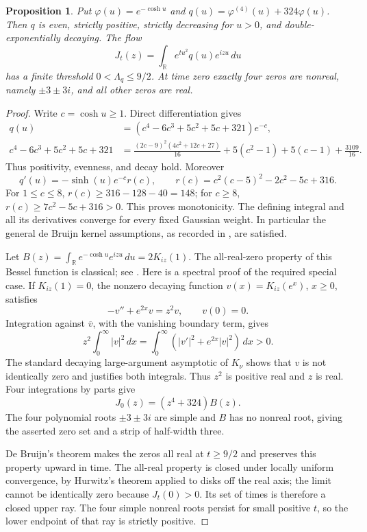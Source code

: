 \documentclass[11pt]{article}
\numberwithin{equation}{section}
\newtheorem{proposition}[theorem]{Proposition}
\theoremstyle{definition}
\theoremstyle{remark}
\newcommand{\dd}{\,d}
\begin{document}
\begin{proposition}\label{prop:kernel}
Put $\varphi(u)=e^{-\cosh u}$ and
$q(u)=\varphi^{(4)}(u)+324\varphi(u)$. Then $q$ is even, strictly
positive, strictly decreasing for $u>0$, and double-exponentially
decaying. The flow
\begin{equation}\label{eq:qflow}
 J_t(z)=\int_{\mathbb R}e^{tu^2}q(u)e^{izu}\dd u
\end{equation}
has a finite threshold $0<\Lambda_q\le9/2$. At time zero exactly four
zeros are nonreal, namely $\pm3\pm3i$, and all other zeros are real.
\end{proposition}
\begin{proof}
Write $c=\cosh u\ge1$. Direct differentiation gives
\begin{align*}
 q(u)&=(c^4-6c^3+5c^2+5c+321)e^{-c},\\
 c^4-6c^3+5c^2+5c+321
 &=\frac{(2c-9)^2(4c^2+12c+27)}{16}
   +5(c^2-1)+5(c-1)+\frac{3109}{16}.
\end{align*}
Thus positivity, evenness, and decay hold. Moreover
\[
 q'(u)=-\sinh(u)e^{-c}r(c),\qquad
 r(c)=c^2(c-5)^2-2c^2-5c+316.
\]
For $1\le c\le8$, $r(c)\ge316-128-40=148$; for $c\ge8$,
$r(c)\ge7c^2-5c+316>0$. This proves monotonicity. The defining
integral and all its derivatives converge for every fixed Gaussian
weight. In particular the general de Bruijn kernel assumptions, as
recorded in \cite[Theorem~7]{newmanwu}, are satisfied.

Let $B(z)=\int_{\mathbb R}e^{-\cosh u}e^{izu}\dd u=2K_{iz}(1)$.
The all-real-zero property of this Bessel function is classical; see
\cite{gasper}. Here is a spectral proof of the required special case.
If $K_{iz}(1)=0$, the nonzero decaying function $v(x)=K_{iz}(e^x)$,
$x\ge0$, satisfies
\[
 -v''+e^{2x}v=z^2v,\qquad v(0)=0.
\]
Integration against $\overline v$, with the vanishing boundary term,
gives
\[
 z^2\int_0^\infty|v|^2\dd x
 =\int_0^\infty(|v'|^2+e^{2x}|v|^2)\dd x>0.
\]
The standard decaying large-argument asymptotic of $K_\nu$ shows that
$v$ is not identically zero and justifies both integrals. Thus $z^2$
is positive real and $z$ is real. Four integrations by parts give
\[
 J_0(z)=(z^4+324)B(z).
\]
The four polynomial roots $\pm3\pm3i$ are simple and $B$ has no
nonreal root, giving the asserted zero set and a strip of half-width
three.

De Bruijn's theorem makes the zeros all real at $t\ge9/2$ and preserves
this property upward in time. The all-real property is closed under
locally uniform convergence, by Hurwitz's theorem applied to disks
off the real axis; the limit cannot be identically zero because
$J_t(0)>0$. Its set of times is therefore a closed upper ray.
The four simple nonreal roots persist for small positive $t$, so the
lower endpoint of that ray is strictly positive.
\end{proof}
\end{document}
